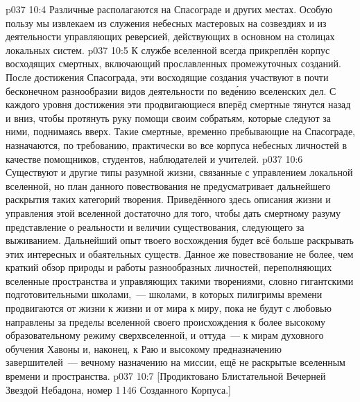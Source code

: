 \vs p037 10:4 \pc Различные  располагаются на Спасограде и других местах. Особую пользу мы извлекаем из служения небесных мастеровых на созвездиях и из деятельности управляющих реверсией, действующих в основном на столицах локальных систем.
\vs p037 10:5 К службе вселенной всегда прикреплён корпус восходящих смертных, включающий прославленных промежуточных созданий. После достижения Спасограда, эти восходящие создания участвуют в почти бесконечном разнообразии видов деятельности по вед\'ению вселенских дел. С каждого уровня достижения эти продвигающиеся вперёд смертные тянутся назад и вниз, чтобы протянуть руку помощи своим собратьям, которые следуют за ними, поднимаясь вверх. Такие смертные, временно пребывающие на Спасограде, назначаются, по требованию, практически во все корпуса небесных личностей в качестве помощников, студентов, наблюдателей и учителей.
\vs p037 10:6 Существуют и другие типы разумной жизни, связанные с управлением локальной вселенной, но план данного повествования не предусматривает дальнейшего раскрытия таких категорий творения. Приведённого здесь описания жизни и управления этой вселенной достаточно для того, чтобы дать смертному разуму представление о реальности и величии существования, следующего за выживанием. Дальнейший опыт твоего восхождения будет всё больше раскрывать этих интересных и обаятельных существ. Данное же повествование не более, чем краткий обзор природы и работы разнообразных личностей, переполняющих вселенные пространства и управляющих такими творениями, словно гигантскими подготовительными школами,~--- школами, в которых пилигримы времени продвигаются от жизни к жизни и от мира к миру, пока не будут с любовью направлены за пределы вселенной своего происхождения к более высокому образовательному режиму сверхвселенной, и оттуда~--- к мирам духовного обучения Хавоны и, наконец, к Раю и высокому предназначению завершителей~--- вечному назначению на миссии, ещё не раскрытые вселенным времени и пространства.
\vsetoff
\vs p037 10:7 [Продиктовано Блистательной Вечерней Звездой Небадона, номер 1\,146 Созданного Корпуса.]
\quizlink
